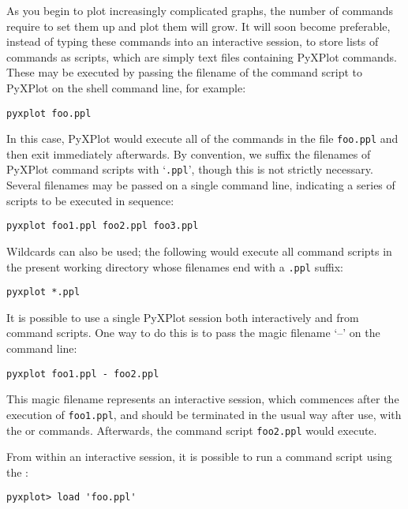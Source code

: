 As you begin to plot increasingly complicated graphs, the number of commands
require to set them up and plot them will grow.  It will soon become
preferable, instead of typing these commands into an interactive session, to
store lists of commands as scripts, which are simply text files containing
PyXPlot commands. These may be executed by passing the filename of the command
script to PyXPlot on the shell command line, for example:

\begin{verbatim}
pyxplot foo.ppl
\end{verbatim}

\noindent In this case, PyXPlot would execute all of the commands in the file
{\tt foo.ppl} and then exit immediately afterwards.  By convention, we suffix
the filenames of PyXPlot command scripts with `{\tt .ppl}', though this is not
strictly necessary. Several filenames may be passed on a single command line,
indicating a series of scripts to be executed in sequence:

\begin{verbatim}
pyxplot foo1.ppl foo2.ppl foo3.ppl
\end{verbatim}

\noindent Wildcards can also be used; the following would execute all command
scripts in the present working directory whose filenames end with a
{\tt .ppl} suffix:

\begin{verbatim}
pyxplot *.ppl
\end{verbatim}

It is possible to use a single PyXPlot session both interactively and from
command scripts. One way to do this is to pass the magic filename `--' on the
command line:

\begin{verbatim}
pyxplot foo1.ppl - foo2.ppl
\end{verbatim}

\noindent This magic filename represents an interactive session, which
commences after the execution of {\tt foo1.ppl}, and should be terminated in
the usual way after use, with the  or  commands.
Afterwards, the command script {\tt foo2.ppl} would execute.

From within an interactive session, it is possible to run a command script
using the :

\begin{verbatim}
pyxplot> load 'foo.ppl'
\end{verbatim}

